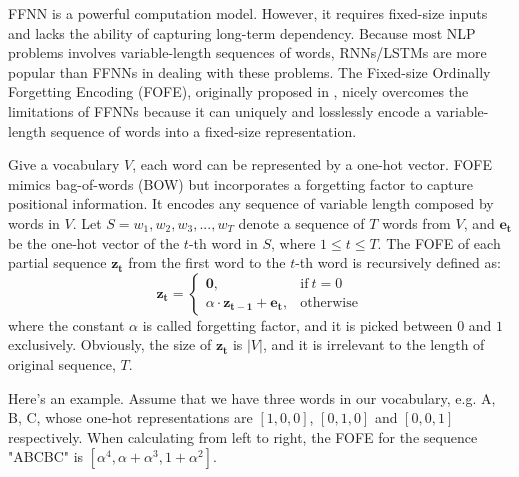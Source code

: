 \documentclass[11pt,a4paper]{article}
\begin{document}
FFNN is a powerful computation model. 
However, it requires fixed-size inputs and 
lacks the ability of capturing long-term dependency. 
Because most NLP problems involves variable-length sequences of words, 
RNNs/LSTMs are more popular than FFNNs in dealing with these problems. 
The Fixed-size Ordinally Forgetting Encoding (FOFE), 
originally proposed in \cite{zhang2015fixed}, nicely overcomes the limitations of FFNNs because it 
can uniquely and losslessly encode a variable-length sequence of words into a fixed-size representation. 

Give a vocabulary $V$, each word can be represented by a one-hot vector. 
FOFE mimics bag-of-words (BOW) but incorporates a forgetting factor to capture positional information.
It encodes any sequence of variable length composed by words in $V$. 
Let $S = {w_1, w_2, w_3, ... , w_T}$ denote a sequence of $T$ words from $V$, 
and $\bm{e_t}$ be the one-hot vector of the $t$-th word in $S$, where $1 \leq t \leq T$.
The FOFE of each partial sequence $\bm{z_t}$ from the first word to the $t$-th word is recursively defined as:
\begin{equation}
\bm{z_t}=
\begin{cases}
\bm{0}, & \text{if}\ t = 0 \\
\alpha \cdot \bm{z_{t - 1}} + \bm{e_t}, & \text{otherwise}
\end{cases}  \label{eq_FOFE_formula}
\end{equation}
where the constant $\alpha$ is called forgetting factor, and it is picked between $0$ and $1$ exclusively. 
Obviously, the size of $\bm{z_t}$ is $|V|$, and it is irrelevant to the length of original sequence, $T$.

Here's an example. Assume that we have three words in our vocabulary, e.g. A, B, C, 
whose one-hot representations are $[1, 0, 0]$, $[0, 1, 0]$ and $[0, 0, 1]$ respectively. 
When calculating from left to right, the FOFE for the sequence 
"ABCBC" is $[{\alpha}^4, {\alpha} + {\alpha}^3, 1 + {\alpha}^2]$.
\end{document}
